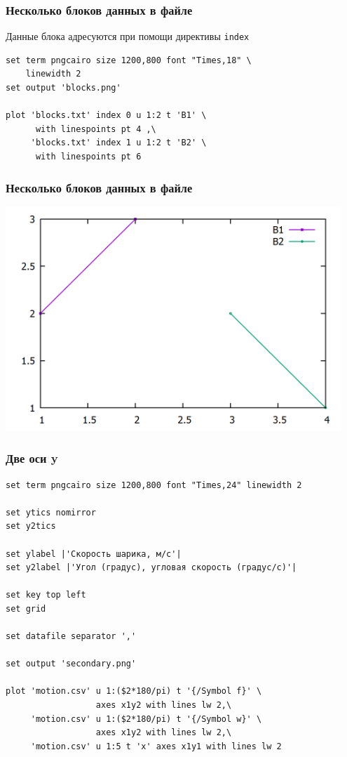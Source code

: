 \documentclass[12pt, compress]{beamer}
\newcommand{\code}[1]{\textcolor{dark-green}{\texttt{#1}}}
\begin{document}
\begin{frame}[c,fragile]
\frametitle{Несколько блоков данных в файле}
Данные блока адресуются при помощи директивы \code{index}
\begin{lstlisting}
set term pngcairo size 1200,800 font "Times,18" \
    linewidth 2
set output 'blocks.png'

plot 'blocks.txt' index 0 u 1:2 t 'B1' \
      with linespoints pt 4 ,\
     'blocks.txt' index 1 u 1:2 t 'B2' \
      with linespoints pt 6
\end{lstlisting}  
\end{frame}

\begin{frame}[t,fragile]
\frametitle{Несколько блоков данных в файле}
\includegraphics[width=0.95\textwidth]{./gp/blocks.png}
\end{frame}

\begin{frame}[t,fragile]
\frametitle{Две оси y}
\begin{lstlisting}[basicstyle={\scriptsize}]
set term pngcairo size 1200,800 font "Times,24" linewidth 2

set ytics nomirror
set y2tics

set ylabel |'Скорость шарика, м/с'|
set y2label |'Угол (градус), угловая скорость (градус/c)'|

set key top left 
set grid 

set datafile separator ','

set output 'secondary.png'

plot 'motion.csv' u 1:($2*180/pi) t '{/Symbol f}' \ 
                  axes x1y2 with lines lw 2,\
     'motion.csv' u 1:($2*180/pi) t '{/Symbol w}' \
                  axes x1y2 with lines lw 2,\
     'motion.csv' u 1:5 t 'x' axes x1y1 with lines lw 2
\end{lstlisting}
\end{frame}
 
\end{document}
